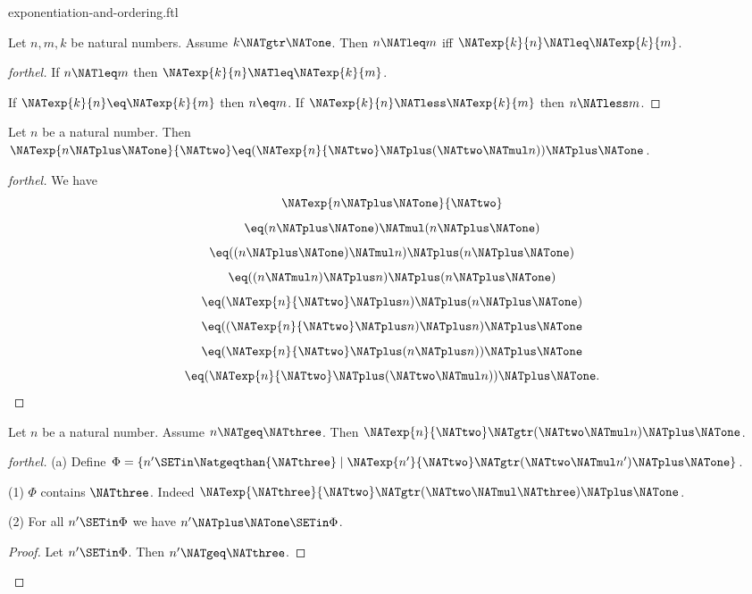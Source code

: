 \documentclass{naproche-library}
\begin{document}
\begin{smodule}[title=Exponentiation and Ordering]{exponentiation-and-ordering.ftl}
\begin{corollary}[forthel,id=ARITHMETIC_09_2876620253691904]
  Let $n, m, k$ be natural numbers.
  Assume $k \NATgtr \NATone$.
  Then $n \NATleq m$ iff $\NATexp{k}{n} \NATleq \NATexp{k}{m}$.
\end{corollary}
\begin{proof}[forthel]
  If $n \NATleq m$ then $\NATexp{k}{n} \NATleq \NATexp{k}{m}$.

  If $\NATexp{k}{n} \eq \NATexp{k}{m}$ then $n \eq m$.
  If $\NATexp{k}{n} \NATless \NATexp{k}{m}$ then $n \NATless m$.
\end{proof}

\begin{proposition}[forthel,id=ARITHMETIC_09_6984104377581568]
  Let $n$ be a natural number.
  Then $\NATexp{n \NATplus \NATone}{\NATtwo} \eq (\NATexp{n}{\NATtwo} \NATplus (\NATtwo \NATmul n)) \NATplus \NATone$.
\end{proposition}
\begin{proof}[forthel]
  We have
  \[  \NATexp{n \NATplus \NATone}{\NATtwo}                       \]
  \[    \eq (n \NATplus \NATone) \NATmul (n \NATplus \NATone)         \]
  \[    \eq ((n \NATplus \NATone) \NATmul n) \NATplus (n \NATplus \NATone)   \]
  \[    \eq ((n \NATmul n) \NATplus n) \NATplus (n \NATplus \NATone)   \]
  \[    \eq (\NATexp{n}{\NATtwo} \NATplus n) \NATplus (n \NATplus \NATone)         \]
  \[    \eq ((\NATexp{n}{\NATtwo} \NATplus n) \NATplus n) \NATplus \NATone         \]
  \[    \eq (\NATexp{n}{\NATtwo} \NATplus (n \NATplus n)) \NATplus \NATone         \]
  \[    \eq (\NATexp{n}{\NATtwo} \NATplus (\NATtwo \NATmul n)) \NATplus \NATone.    \]
\end{proof}

\begin{proposition}[forthel,id=ARITHMETIC_09_134060414337024]
  Let $n$ be a natural number.
  Assume $n \NATgeq \NATthree$.
  Then $\NATexp{n}{\NATtwo} \NATgtr (\NATtwo \NATmul n) \NATplus \NATone$.
\end{proposition}
\begin{proof}[forthel]
  (a) Define $\Phi = \{ n' \SETin \Natgeqthan{\NATthree} \mid \NATexp{n'}{\NATtwo} \NATgtr (\NATtwo \NATmul n') \NATplus \NATone \}$.

  (1) $\Phi$ contains $\NATthree$.
  Indeed $\NATexp{\NATthree}{\NATtwo} \NATgtr (\NATtwo \NATmul \NATthree) \NATplus \NATone$.

  (2) For all $n' \SETin \Phi$ we have $n' \NATplus \NATone \SETin \Phi$.
  \begin{proof}
    Let $n' \SETin \Phi$.
    Then $n' \NATgeq \NATthree$.


\end{proof}
\end{proof}
\end{smodule}
\end{document}
